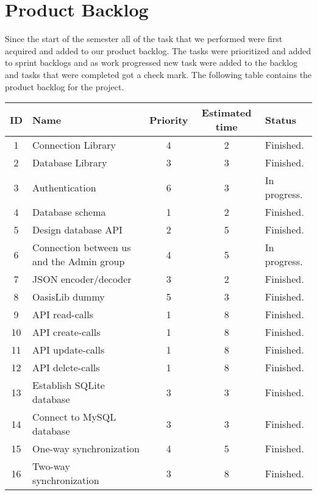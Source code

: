 \section{Product Backlog}
Since the start of the semester all of the task that we performed were first acquired and added to our product backlog. The tasks were prioritized and added to sprint backlogs and as work progressed new task were added to the backlog and tasks that were completed got a check mark. The following table contains the product backlog for the project.

\begin{center}
	\begin{tabular}{| c | p{4cm} | c | c | l |}
	\hline
	\textbf{ID} 	& \textbf{Name} 										& \textbf{Priority} 	& \textbf{Estimated time} 	& \textbf{Status} 			\\ 	\hline
	1 	& Connection Library 						& 4 		& 2 				& Finished. 		\\	\hline
	2 	& Database Library 							& 3 		& 3 				& Finished. 		\\	\hline
	3 	& Authentication 							& 6 		& 3 				& In progress. 		\\ 	\hline
	4 	& Database schema 							& 1 		& 2 				& Finished. 		\\	\hline
	5 	& Design database API 						& 2 		& 5 				& Finished. 		\\	\hline
	6 	& Connection between us and the Admin group & 4 		& 5 				& In progress. 		\\ 	\hline
	7 	& JSON encoder/decoder 						& 3 		& 2 				& Finished. 		\\	\hline
	8 	& OasisLib dummy							& 5 		& 3 				& Finished. 		\\	\hline
	9 	& API read-calls 							& 1 		& 8 				& Finished. 		\\ 	\hline
	10 	& API create-calls 							& 1 		& 8 				& Finished. 		\\	\hline
	11 	& API update-calls 							& 1 		& 8 				& Finished. 		\\	\hline
	12	& API delete-calls							& 1 		& 8 				& Finished. 		\\ 	\hline
	13 	& Establish SQLite database 				& 3 		& 3 				& Finished. 		\\	\hline
	14	& Connect to MySQL database 				& 3 		& 3 				& Finished. 		\\	\hline
	15	& One-way synchronization					& 4 		& 5 				& Finished. 		\\ 	\hline
	16	& Two-way synchronization					& 3 		& 8 				& Finished. 		\\	\hline

\end{tabular}
\end{center}
